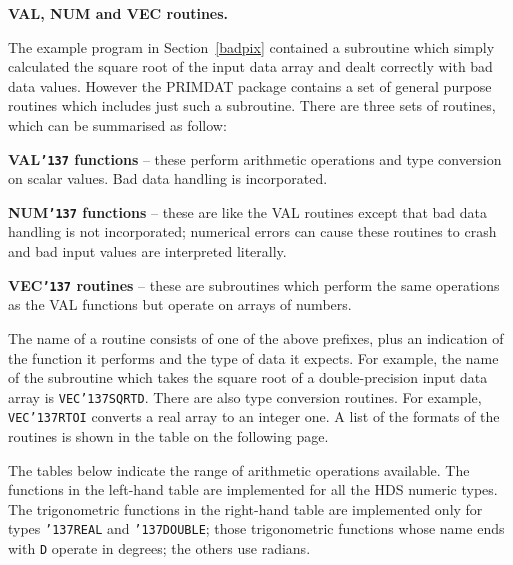 \documentclass[twoside,11pt]{article}
\renewcommand{\_}{{\tt\char'137}}
\begin{document}
{\bigskip\large\bf VAL, NUM and VEC routines.}

The example program in Section~\ref{badpix} contained a subroutine
which simply calculated the square root of the input data array and
dealt correctly with bad data values.
However the PRIMDAT package contains a set of general purpose routines
which includes just such a subroutine.
There are three sets of routines, which can be summarised as follow:
\begin{description}
\item{ \bf VAL\_ functions} -- these perform arithmetic operations and type
conversion on scalar values. Bad data handling is incorporated.
\item{\bf NUM\_ functions} -- these are like the VAL routines except that bad
data handling is not incorporated; numerical errors can cause these
routines to crash and bad input values are interpreted literally.
\item{\bf VEC\_ routines} -- these are subroutines which perform the
same operations as the VAL functions but operate on arrays of numbers.
\end{description}

The name of a routine consists of one of the above prefixes, plus an
indication of the function it performs and the type of data it expects.
For example, the name of the subroutine which takes the square root of a
double-precision input data array is {\tt VEC\_SQRTD}.
There are also type conversion routines. For example, {\tt VEC\_RTOI}
converts a real array to an integer one.
A list of the formats of the routines is shown in the table on the following
page.

The tables below indicate the range of arithmetic operations available.
The functions in the left-hand table are implemented for all the HDS
numeric types.
The trigonometric functions in the right-hand table are implemented only
for types {\tt\_REAL} and {\tt\_DOUBLE}; those trigonometric
functions whose name
ends with {\tt D} operate in degrees; the others use radians.
\end{document}
